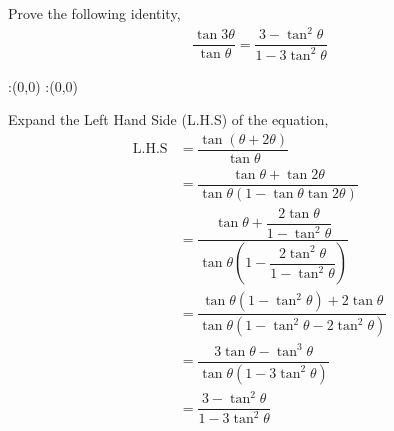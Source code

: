 

\question[3] Prove the following identity,
\begin{align}
  \dfrac{\tan3\theta}{\tan\theta} 
    = \dfrac{3-\tan^2\theta}{1-3\tan^2\theta} \nonumber
\end{align} 


\ifprintanswers
  \begin{marginfigure}
      :(0,0)
      :(0,0)
    \figdrawbegin{}
      \figdrawline [100,101]
    \figdrawend
    \figvisu{\figBoxA}{}{%
    }
    \centerline{\box\figBoxA}
  \end{marginfigure}
\fi 

\begin{solution}[\halfpage]
  Expand the Left Hand Side (L.H.S) of the equation,
  \begin{align}
    \text{L.H.S} &= \dfrac{\tan(\theta+2\theta)}{\tan\theta} \\
                 &= \dfrac{\tan\theta+\tan2\theta}
                          {\tan\theta(1-\tan\theta\tan2\theta)} \\
                 &= \dfrac{\tan\theta+\dfrac{2\tan\theta}{1-\tan^2\theta}}
                          {\tan\theta
                            \left(1-\dfrac{2\tan^2\theta}
                                          {1-\tan^2\theta}\right)} \\
                 &= \dfrac{\tan\theta(1-\tan^2\theta)+2\tan\theta}
                          {\tan\theta(1-\tan^2\theta-2\tan^2\theta)} \\
				 &= \dfrac{3\tan\theta-\tan^3\theta}
				          {\tan\theta(1-3\tan^2\theta)} \\
				 &= \dfrac{3-\tan^2\theta}{1-3\tan^2\theta}
  \end{align}

\end{solution}
